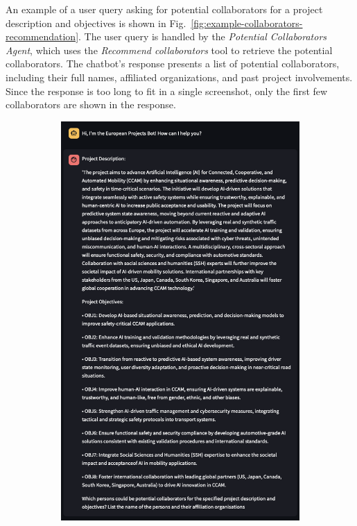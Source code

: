 An example of a user query asking for potential collaborators for a project description and objectives is shown in Fig.~\ref{fig:example-collaborators-recommendation}.
The user query is handled by the \textit{Potential Collaborators Agent}, which uses the \textit{Recommend collaborators} tool to retrieve the potential collaborators.
The chatbot's response presents a list of potential collaborators, including their full names, affiliated organizations, and past project involvements.
Since the response is too long to fit in a single screenshot, only the first few collaborators are shown in the response.

\begin{figure}[h]
    \centering
    \begin{subfigure}{0.45\textwidth}
        \centering
        \includegraphics[width=.7\textwidth]{figures/implementation/example-collaborators-recommendation-question.png}
        \caption{}
        \label{fig:example-collaborators-question}
    \end{subfigure}
    \hfill
    \begin{subfigure}{0.45\textwidth}
        \centering

\end{subfigure}
\end{figure}
